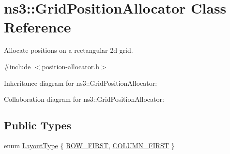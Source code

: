 \hypertarget{classns3_1_1GridPositionAllocator}{}\section{ns3\+:\+:Grid\+Position\+Allocator Class Reference}
\label{classns3_1_1GridPositionAllocator}


Allocate positions on a rectangular 2d grid.  




{\ttfamily \#include $<$position-\/allocator.\+h$>$}



Inheritance diagram for ns3\+:\+:Grid\+Position\+Allocator\+:


Collaboration diagram for ns3\+:\+:Grid\+Position\+Allocator\+:
\subsection*{Public Types}
\begin{DoxyCompactItemize}
\item 
enum \hyperlink{classns3_1_1GridPositionAllocator_a31cab553ee810e780d5dce3ed4336b15}{Layout\+Type} \{ \hyperlink{classns3_1_1GridPositionAllocator_a31cab553ee810e780d5dce3ed4336b15ae2c3a68ac2b72dfc65ed3e7422e57fc9}{R\+O\+W\+\_\+\+F\+I\+R\+ST}, 
\hyperlink{classns3_1_1GridPositionAllocator_a31cab553ee810e780d5dce3ed4336b15a8dab5860b0cb60386bed383efccb8389}{C\+O\+L\+U\+M\+N\+\_\+\+F\+I\+R\+ST}
 \}
\end{DoxyCompactItemize}
